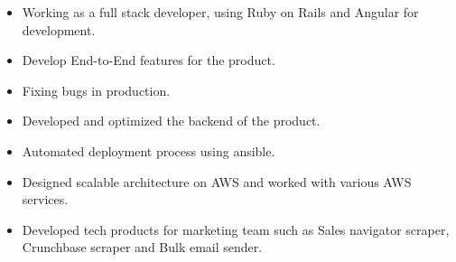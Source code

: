 \documentclass[10pt,a4paper]{main}
\begin{document}
\tagline{}

%

\begin{fullwidth}
\makecvheader
\end{fullwidth}

%





\begin{itemize}
	\item Working as a full stack developer, using Ruby on Rails and Angular for development.
    \item Develop End-to-End features for the product.
    \item Fixing bugs in production.
\end{itemize}

\divider
%



\begin{itemize}
  \item Developed and optimized the backend of the product.
    \item Automated deployment process using ansible.
    \item Designed scalable architecture on AWS and worked with various AWS services.
    \item Developed tech products for marketing team such as Sales navigator scraper, Crunchbase scraper and Bulk email sender.
\end{itemize}

\divider
%


\end{document}
